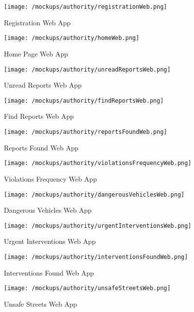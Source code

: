 	\begin{figure}[h!]
		\centering
		\texttt{[image: /mockups/authority/registrationWeb.png]}
		\caption{Registration Web App}
	\end{figure}

	\begin{figure}[h!]
		\centering
		\texttt{[image: /mockups/authority/homeWeb.png]}
		\caption{Home Page Web App}
	\end{figure}
 
 	\begin{figure}[h!]
 		\centering
 		\texttt{[image: /mockups/authority/unreadReportsWeb.png]}
 		\caption{Unread Reports Web App}
 	\end{figure}
 
 	\begin{figure}[h!]
 		\centering
 		\texttt{[image: /mockups/authority/findReportsWeb.png]}
 		\caption{Find Reports Web App}
 	\end{figure}
 
 	\begin{figure}[h!]
 		\centering
 		\texttt{[image: /mockups/authority/reportsFoundWeb.png]}
 		\caption{Reports Found Web App}
 	\end{figure}
 
 	\begin{figure}[h!]
 		\centering
 		\texttt{[image: /mockups/authority/violationsFrequencyWeb.png]}
 		\caption{Violations Frequency Web App}
 	\end{figure}
 
 	\begin{figure}[h!]
 		\centering
 		\texttt{[image: /mockups/authority/dangerousVehiclesWeb.png]}
 		\caption{Dangerous Vehicles Web App}
 	\end{figure}
 
 	\begin{figure}[h!]
 		\centering
 		\texttt{[image: /mockups/authority/urgentInterventionsWeb.png]}
 		\caption{Urgent Interventions Web App}
 	\end{figure}
 
	\begin{figure}[h!]
		\centering
		\texttt{[image: /mockups/authority/interventionsFoundWeb.png]}
		\caption{Interventions Found Web App}
	\end{figure} 

	\FloatBarrier

	\begin{figure}[ht!]
		\centering
		\texttt{[image: /mockups/authority/unsafeStreetsWeb.png]}
		\caption{Unsafe Streets Web App}
	\end{figure}
	
